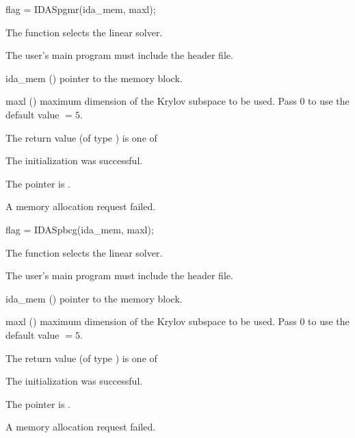 {
  flag = IDASpgmr(ida\_mem, maxl);
}
{
  The function  selects the {\idaspgmr} linear solver. 

  The user's main program must include the  header file.
}
{
  \begin{args}
  \item[ida\_mem] ()
    pointer to the {\idas} memory block.
  \item[maxl] ()
    maximum dimension of the Krylov subspace to be used. Pass $0$ to use the 
    default value $=5$.
  \end{args}
}
{
  The return value  (of type ) is one of
  \begin{args}
  \item[\Id{IDASPILS\_SUCCESS}] 
    The {\idaspgmr} initialization was successful.
  \item[\Id{IDASPILS\_MEM\_NULL}]
    The  pointer is .
  \item[\Id{IDASPILS\_MEM\_FAIL}]
    A memory allocation request failed.
  \end{args}
}
{}
{
  flag = IDASpbcg(ida\_mem, maxl);
}
{
  The function  selects the {\idaspbcg} linear solver. 

  The user's main program must include the  header file.
}
{
  \begin{args}
  \item[ida\_mem] ()
    pointer to the {\idas} memory block.
  \item[maxl] ()
    maximum dimension of the Krylov subspace to be used. Pass $0$ to use the 
    default value $=5$.
  \end{args}
}
{
  The return value  (of type ) is one of
  \begin{args}
  \item[\Id{IDASPILS\_SUCCESS}] 
    The {\idaspbcg} initialization was successful.
  \item[\Id{IDASPILS\_MEM\_NULL}]
    The  pointer is .
  \item[\Id{IDASPILS\_MEM\_FAIL}]
    A memory allocation request failed.
  \end{args}
}
